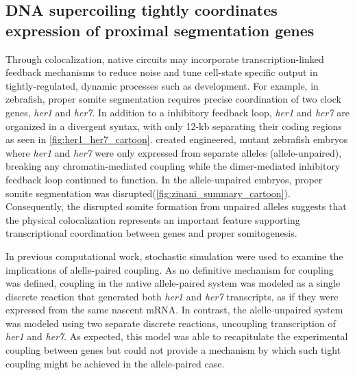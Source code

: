 \documentclass[11pt]{article}
\begin{document}
\subsection{DNA supercoiling tightly coordinates expression of proximal segmentation genes}
Through colocalization, native circuits may incorporate transcription-linked feedback mechanisms to reduce noise and tune cell-state specific output in tightly-regulated, dynamic processes such as development. For example, in zebrafish, proper somite segmentation requires precise coordination of two clock genes, \textit{her1} and \textit{her7}. In addition to a inhibitory feedback loop, \textit{her1} and \textit{her7} are organized in a divergent syntax, with only 12-kb separating their coding regions as seen in \cref{fig:her1_her7_cartoon}. \Textcite{zinaniPairingSegmentationClock2021} created engineered, mutant zebrafish embryos where \emph{her1} and \emph{her7} were only expressed from separate alleles (allele-unpaired), breaking any chromatin-mediated coupling while the dimer-mediated inhibitory feedback loop continued to function. In the allele-unpaired embryos, proper somite segmentation was disrupted(\cref{fig:zinani_summary_cartoon}). Consequently, the disrupted somite formation from unpaired alleles suggests that the physical colocalization represents an important feature supporting transcriptional coordination between genes and proper somitogenesis. 

In previous computational work, stochastic simulation were used to examine the implications of alelle-paired coupling.\parencite{zinaniPairingSegmentationClock2021} As no definitive mechanism for coupling was defined, coupling in the native allele-paired system was modeled as a single discrete reaction that generated both \textit{her1} and \textit{her7} transcripts, as if they were expressed from the same nascent mRNA. In contrast, the alelle-unpaired system was modeled using two separate discrete reactions, uncoupling transcription of  \textit{her1} and \textit{her7}.
As expected, this model was able to recapitulate the experimental coupling between genes but could not provide a mechanism by which such tight coupling might be achieved in the allele-paired case.
\end{document}
